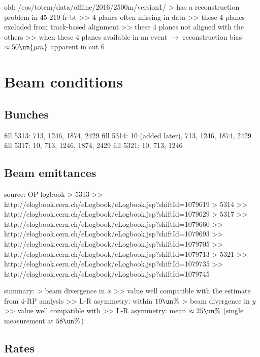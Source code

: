 \> old: /eos/totem/data/offline/2016/2500m/version1/
\>> has a reconstruction problem in 45-210-fr-bt
\>>> 4 planes often missing in data
\>>> these 4 planes excluded from track-based alignment
\>>> these 4 planes not aligned with the others
\>>> when these 4 planes available in an event $\rightarrow$ reconstruction bias $\approx 50\un{\mu m}$ apparent in cut 6


\chapter[beam-cond]{Beam conditions}

\section[beam-cond-bunches]{Bunches}

\> fill 5313: 713, 1246, 1874, 2429
\> fill 5314: 10 (added later), 713, 1246, 1874, 2429
\> fill 5317: 10, 713, 1246, 1874, 2429
\> fill 5321: 10, 713, 1246

\section[beam-cond-emittance]{Beam emittances}

\> source: OP logbook
\>> 5313
\>>> http://elogbook.cern.ch/eLogbook/eLogbook.jsp?shiftId=1079619
\>> 5314
\>>> http://elogbook.cern.ch/eLogbook/eLogbook.jsp?shiftId=1079629
\>> 5317
\>>> http://elogbook.cern.ch/eLogbook/eLogbook.jsp?shiftId=1079660
\>>> http://elogbook.cern.ch/eLogbook/eLogbook.jsp?shiftId=1079693
\>>> http://elogbook.cern.ch/eLogbook/eLogbook.jsp?shiftId=1079705
\>>> http://elogbook.cern.ch/eLogbook/eLogbook.jsp?shiftId=1079713
\>> 5321
\>>> http://elogbook.cern.ch/eLogbook/eLogbook.jsp?shiftId=1079735
\>>> http://elogbook.cern.ch/eLogbook/eLogbook.jsp?shiftId=1079745

\> summary: 
\>> beam divergence in $x$
\>>> value well compatible with the estimate from 4-RP analysis
\>>> L-R asymmetry: within $10\un{\%}$
\>> beam divergence in $y$
\>>> value well compatible with 
\>>> L-R asymmetry: mean $\approx 25\un{\%}$ (single measurement at $58\un{\%}$)

\section[beam-cond-rates]{Rates}

